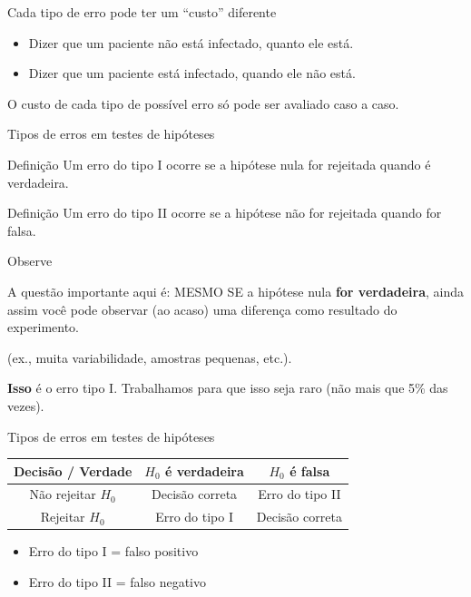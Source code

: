 \documentclass{beamer}
\begin{document}
\begin{frame}{\scriptsize Cada tipo de erro pode ter um ``custo'' diferente}
  \begin{itemize}
    \small
  \item Dizer que um paciente não está infectado, quanto ele está.
  \item Dizer que um paciente está infectado, quando ele não está.
  \end{itemize}

  \bigskip
  \begin{block}{}
    \footnotesize
    O custo de cada tipo de possível erro só pode ser avaliado caso a caso.
  \end{block}
\end{frame}

\begin{frame}{\scriptsize Tipos de erros em testes de hipóteses}
  \begin{block}{Definição}
    \footnotesize
    Um \alert{erro do tipo I} ocorre se a hipótese nula for rejeitada
    quando é verdadeira.
  \end{block}
  \begin{block}{Definição}
    \footnotesize
    Um \alert{erro do tipo II} ocorre se a hipótese não for rejeitada
    quando for falsa.
  \end{block}
\end{frame}

\begin{frame}[label=observacao]{\scriptsize Observe}
  \begin{block}{A questão importante aqui é:}
    \footnotesize
    MESMO SE a hipótese nula {\bf for verdadeira}, ainda assim você pode observar (ao acaso) uma diferença como resultado do experimento.

    \bigskip
    (ex., muita variabilidade, amostras pequenas, etc.).

    \bigskip
    {\bf Isso} é o erro tipo I. Trabalhamos para que isso seja raro (não mais que 5\% das vezes).
  \end{block}
\end{frame}

\begin{frame}{\scriptsize Tipos de erros em testes de hipóteses}
  \begin{block}{}
    \footnotesize
    \begin{tabular}{c||c|c}
      Decisão / Verdade & $H_0$ é verdadeira & $H_0$ é falsa \\
      \hline
      \hline
      Não rejeitar $H_0$ & Decisão correta & Erro do tipo II\\
      \hline
      Rejeitar $H_0$ & Erro do tipo I & Decisão correta\\
    \end{tabular}
  \end{block}
  \begin{itemize}
  \item Erro do tipo I = falso positivo
  \item Erro do tipo II = falso negativo
  \end{itemize}
\end{frame}
\end{document}
